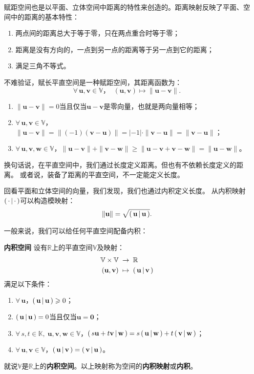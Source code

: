 \documentclass[12pt,UTF8,fontset=none]{ctexbook}
\begin{document}
赋距空间也是以平面、立体空间中距离的特性来创造的。距离映射反映了平面、空间中的距离的基本特性：
\begin{enumerate}
    \item 两点间的距离总大于等于零，只在两点重合时等于零；
    \item 距离是没有方向的，一点到另一点的距离等于另一点到它的距离；
    \item 满足三角不等式。
\end{enumerate}

不难验证，赋长平直空间是一种赋距空间，其距离函数为：
$$ \forall \, \mathbf{u}, \mathbf{v} \in \mathbb{V}，\;\; (\mathbf{u}, \mathbf{v}) \mapsto \| \mathbf{u} - \mathbf{v} \|.$$
\begin{enumerate}
    \item $\| \mathbf{u} - \mathbf{v} \| = 0$当且仅当$\mathbf{u} - \mathbf{v}$是零向量，也就是两向量相等；
    \item $\forall \, \mathbf{u}, \mathbf{v} \in \mathbb{V}$，$\| \mathbf{u} - \mathbf{v} \| = \| (-1) (\mathbf{v} - \mathbf{u}) \| = |-1|\cdot \| \mathbf{v} - \mathbf{u} \| = \| \mathbf{v} - \mathbf{u} \|$；
    \item $\forall \, \mathbf{u}, \mathbf{v}, \mathbf{w} \in \mathbb{V}$，$\| \mathbf{u} - \mathbf{v} \| + \| \mathbf{v} - \mathbf{w} \| \geqslant \| \mathbf{u} - \mathbf{v} + \mathbf{v} - \mathbf{w}\| = \| \mathbf{u} - \mathbf{w} \|$。
\end{enumerate}

换句话说，在平直空间中，我们通过长度定义距离。但也有不依赖长度定义的距离。
或者说，装备了距离的平直空间，不一定能定义长度。

回看平面和立体空间的向量，我们发现，我们也通过内积定义长度。
从内积映射$\displaystyle\left( \,\cdot \,\middle\vert \,\cdot \,\right)$可以构造模映射：
$$ \| \mathbf{u} \| = \sqrt{\displaystyle\left( \,\mathbf{u} \,\middle\vert \,\mathbf{u} \,\right)}.$$

一般来说，我们可以给任何平直空间配备内积：
\begin{df}{\textbf{内积空间}}
    设有$\mathbb{R}$上的平直空间$\mathbb{V}$及映射：
    \begin{align*}
        \mathbb{V}\times \mathbb{V} \;&\rightarrow \;\mathbb{R} \\
        (\mathbf{u}, \mathbf{v}) \;&\mapsto \; \displaystyle\left( \,\mathbf{u} \,\middle\vert \,\mathbf{v} \,\right)
    \end{align*}
    满足以下条件：
    \begin{enumerate}
        \item $\forall \, \mathbf{u}$，$\displaystyle\left( \,\mathbf{u} \,\middle\vert \,\mathbf{u} \,\right) \geqslant 0$；
        \item $\displaystyle\left( \,\mathbf{u} \,\middle\vert \,\mathbf{u} \,\right) = 0$当且仅当$\mathbf{u} = \mathbf{0}$；
        \item $\forall \, s, t \in \mathbb{K}, \; \mathbf{u}, \mathbf{v}, \mathbf{w}\in \mathbb{V}$，$\displaystyle\left( \,s\mathbf{u} + t\mathbf{v} \,\middle\vert \,\mathbf{w} \,\right) = s\displaystyle\left( \,\mathbf{u} \,\middle\vert \,\mathbf{w} \,\right) + t\displaystyle\left( \,\mathbf{v} \,\middle\vert \,\mathbf{w} \,\right)$；
        \item $\forall \, \mathbf{u}, \mathbf{v} \in \mathbb{V}$，$\displaystyle\left( \,\mathbf{u} \,\middle\vert \,\mathbf{v} \,\right) = \displaystyle\left( \,\mathbf{v} \,\middle\vert \,\mathbf{u} \,\right)$。
    \end{enumerate}
    就说$\mathbb{V}$是$\mathbb{R}$上的\textbf{内积空间}。以上映射称为空间的\textbf{内积映射}或\textbf{内积}。
\end{df}
\end{document}
